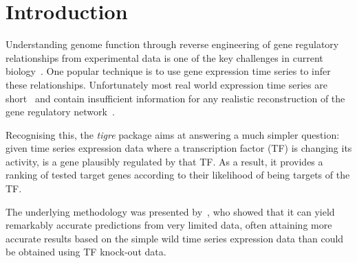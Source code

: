 \documentclass{bioinfo}
\newcommand{\tigre}{\emph{tigre}}
\begin{document}
\section{Introduction}

Understanding genome function through reverse engineering of gene
regulatory relationships from experimental data is one of the key
challenges in current biology~\citep{ENCODE2007,Bickel2009e}.  One
popular technique is to use gene expression time series to infer these
relationships.  Unfortunately most real world expression time series
are short~\citep{Ernst2005} and contain insufficient information for
any realistic reconstruction of the gene regulatory
network~\citep{Smet2010}.

Recognising this, the \tigre{} package aims at answering a much
simpler question: given time series expression data where a
transcription factor (TF) is changing its activity, is a gene
plausibly regulated by that TF.  As a result, it provides a ranking of
tested target genes according to their likelihood of being targets of
the TF.

The underlying methodology was presented by~\citet{Honkela2010PNAS},
who showed that it can yield remarkably accurate predictions from very
limited data, often attaining more accurate results based on the
simple wild time series expression data than could be obtained using
TF knock-out data.
\end{document}
